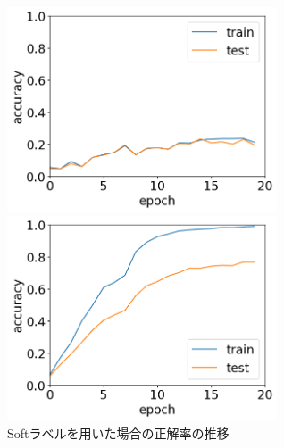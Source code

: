 \documentclass[11pt,a4paper,uplatex]{ujarticle}
\begin{document}
  \begin{figure}[tbp]
    \begin{minipage}[b]{0.495\textwidth}
      \centering
      \includegraphics[keepaspectratio, width=80mm]{Images/python/acc_202402051931.png}
    \end{minipage}
    \begin{minipage}[b]{0.495\textwidth}
      \centering
      \includegraphics[keepaspectratio, width=80mm]{Images/python/acc_202402052150.png}
    \end{minipage}
    \caption{Softラベルを用いた場合の正解率の推移}
    \label{fig:acc_soft}
  \end{figure}
\end{document}
